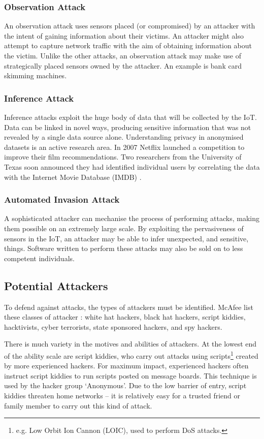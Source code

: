 \documentclass[10pt,journal,compsoc]{IEEEtran}
\begin{document}
\subsubsection{Observation Attack}
An observation attack uses sensors placed (or compromised) by an
attacker with the intent of gaining information about their victims. An
attacker might also attempt to capture network traffic with the aim of
obtaining information about the victim. Unlike the other attacks, an
observation attack may make use of strategically placed sensors owned by the
attacker. An example is bank card skimming machines. 

\subsubsection{Inference Attack}
Inference attacks exploit the huge body of data that will be collected by the
IoT. Data can be linked in novel ways, producing sensitive information that was
not revealed by a single data source alone. Understanding privacy in anonymised
datasets is an active research area. In 2007 Netflix launched a competition to
improve their film recommendations. Two researchers from the University of
Texas soon announced they had identified individual users by correlating the
data with the Internet Movie Database (IMDB) \cite{Narayanan2008}.

\subsubsection{Automated Invasion Attack}
A sophisticated attacker can mechanise the process of performing attacks,
making them possible on an extremely large scale. By exploiting the
pervasiveness of sensors in the IoT, an attacker may be able to infer
unexpected, and sensitive, things. Software written to perform these attacks
may also be sold on to less competent individuals. 

\subsection{Potential Attackers}
To defend against attacks, the types of attackers must be identified. McAfee
list these classes of attacker \cite{McAfee2011}: white hat hackers, black hat
hackers, script kiddies, hacktivists, cyber terrorists, state sponsored
hackers, and spy hackers. 

There is much variety in the motives and abilities of attackers. At
the lowest end of the ability scale are script kiddies, who carry out attacks
using scripts\footnote{e.g. Low Orbit Ion Cannon (LOIC), used to perform DoS
attacks.} created by more experienced hackers. For maximum impact, experienced
hackers often instruct script kiddies to run scripts posted on message boards.
This technique is used by the hacker group `Anonymous'. Due to the low barrier
of entry, script kiddies threaten home networks -- it is relatively easy for a
trusted friend or family member to carry out this kind of attack. 
\end{document}
